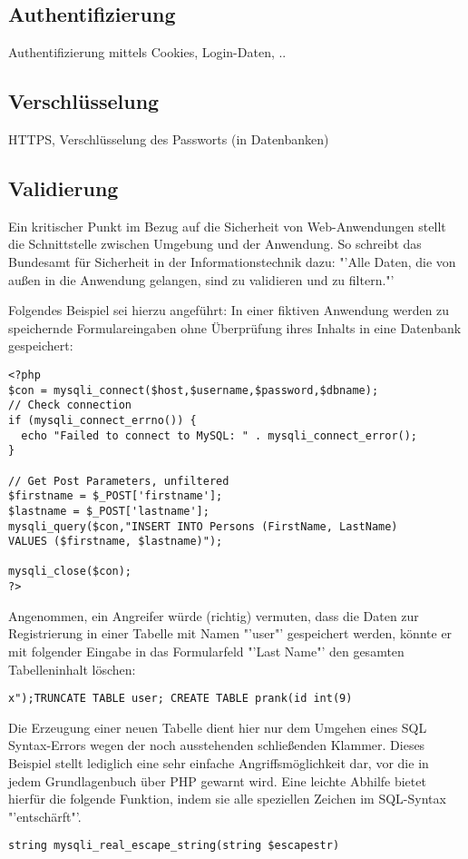 \documentclass[12pt]{report}
\begin{document}
\subsection{Authentifizierung}
Authentifizierung mittels Cookies, Login-Daten, ..
\subsection{Verschlüsselung}
HTTPS, Verschlüsselung des Passworts (in Datenbanken)
\subsection{Validierung}
Ein kritischer Punkt im Bezug auf die Sicherheit von Web-Anwendungen stellt die Schnittstelle zwischen Umgebung und der Anwendung. \cite[S.212]{ebooks:Architekturen} So schreibt das Bundesamt für Sicherheit in der Informationstechnik dazu: "'Alle Daten, die von außen in die Anwendung gelangen, sind zu validieren und zu filtern."'
\cite[S.20]{BSI}

Folgendes Beispiel sei hierzu angeführt: 
In einer fiktiven Anwendung werden zu speichernde Formulareingaben ohne Überprüfung ihres Inhalts in eine Datenbank gespeichert:

\begin{lstlisting}
<?php
$con = mysqli_connect($host,$username,$password,$dbname);
// Check connection
if (mysqli_connect_errno()) {
  echo "Failed to connect to MySQL: " . mysqli_connect_error();
}

// Get Post Parameters, unfiltered
$firstname = $_POST['firstname'];
$lastname = $_POST['lastname'];
mysqli_query($con,"INSERT INTO Persons (FirstName, LastName)
VALUES ($firstname, $lastname)");

mysqli_close($con);
?>
\end{lstlisting}

Angenommen, ein Angreifer würde (richtig) vermuten, dass die Daten zur Registrierung in einer Tabelle mit Namen "'user"' gespeichert werden, könnte er mit folgender Eingabe in das Formularfeld "'Last Name"' den gesamten Tabelleninhalt löschen:
\begin{lstlisting}
x");TRUNCATE TABLE user; CREATE TABLE prank(id int(9)
\end{lstlisting}
Die Erzeugung einer neuen Tabelle dient hier nur dem Umgehen eines SQL Syntax-Errors wegen der noch ausstehenden schließenden Klammer.
Dieses Beispiel stellt lediglich eine sehr einfache Angriffsmöglichkeit dar, vor die in jedem Grundlagenbuch über PHP gewarnt wird. Eine leichte Abhilfe bietet hierfür die folgende Funktion, indem sie alle speziellen Zeichen im SQL-Syntax "'entschärft"'.
\begin{lstlisting}
string mysqli_real_escape_string(string $escapestr)
\end{lstlisting}
\end{document}
